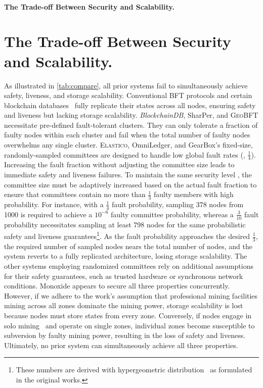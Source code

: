 \ifspace
\paragraph{The Trade-off Between Security and Scalability.}
\else
\section{The Trade-off Between Security and Scalability.}
\fi
As illustrated in \autoref{tab:compare}, all prior systems fail to simultaneously achieve safety, liveness, and storage scalability.
Conventional BFT protocols and certain blockchain databases~\cite{peng2020falcondb} fully replicate their states across all nodes, ensuring safety and liveness but lacking storage scalability.
\textit{BlockchainDB}, SharPer, and \textsc{GeoBFT} necessitate pre-defined fault-tolerant clusters.
They can only tolerate a fraction of faulty nodes within each cluster and fail when the total number of faulty nodes overwhelms any single cluster.
\textsc{Elastico}, OmniLedger, and GearBox's fixed-size, randomly-sampled committees are designed to handle low global fault rates (\eg, $\frac{1}{4}$).
Increasing the fault fraction without adjusting the committee size leads to immediate safety and liveness failures.
To maintain the same security level  , the committee size must be adaptively increased based on the actual fault fraction to ensure that committees contain no more than $\frac{1}{3}$ faulty members with high probability.
For instance, with a $\frac{1}{4}$ fault probability, sampling 378 nodes from 1000 is required to achieve a $10^{-6}$ faulty committee probability, whereas a $\frac{3}{10}$ fault probability necessitates sampling at least 798 nodes for the same probabilistic safety and liveness guarantees\footnote{These numbers are derived with hypergeometric distribution~\cite{hypergeometric-distr} as formulated in the original works.}.
As the fault probability approaches the desired $\frac{1}{3}$, the required number of sampled nodes nears the total number of nodes, and the system reverts to a fully replicated architecture, losing storage scalability.
The other systems employing randomized committees rely on additional assumptions for their safety guarantees, such as trusted hardware or synchronous network conditions.
Monoxide appears to secure all three properties concurrently.
However, if we adhere to the work's assumption that professional mining facilities mining across all zones dominate the mining power, storage scalability is lost because nodes must store states from every zone.
Conversely, if nodes engage in solo mining~\cite{bitcoin_solo_mining} and operate on single zones, individual zones become susceptible to subversion by faulty mining power, resulting in the loss of safety and liveness.
Ultimately, no prior system can simultaneously achieve all three properties.